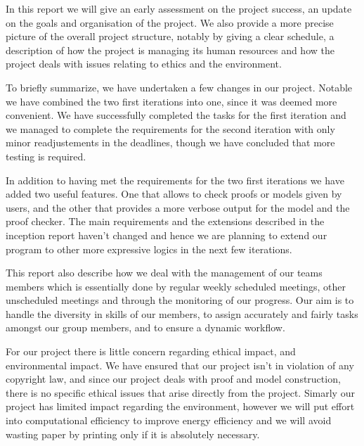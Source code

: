 In this report we will give an early assessment on the project success, an update on the goals and organisation of the project. We also provide a more precise picture of the overall project structure, notably by giving a clear schedule, a description of how the project is managing its human resources and how the project deals with issues relating to ethics and the environment.

To briefly summarize, we have undertaken a few changes in our project. Notable we have combined the two first iterations into one, since it was deemed more convenient. We have successfully completed the tasks for the first iteration and we managed to complete the requirements for the second iteration with only minor readjustements in the deadlines, though we have concluded that more testing is required.

In addition to having met the requirements for the two first iterations we have added two useful features. One that allows to check proofs or models given by users, and the other that provides a more verbose output for the model and the proof checker. The main requirements and the extensions described in the inception report haven't changed and hence we are planning to extend our program to other more expressive logics in the next few iterations.

This report also describe how we deal with the management of our teams members which is essentially done by regular weekly scheduled meetings, other unscheduled meetings and through the monitoring of our progress. Our aim is to handle the diversity in skills of our members, to assign accurately and fairly tasks amongst our group members, and to ensure a dynamic workflow.

For our project there is little concern regarding ethical impact, and environmental impact. We have ensured that our project isn't in violation of any copyright law, and since our project deals with proof and model construction, there is no specific ethical issues that arise directly from the project. Simarly our project has limited impact regarding the environment, however we will put effort into computational efficiency to improve energy efficiency and we will avoid wasting paper by printing only if it is absolutely necessary.
